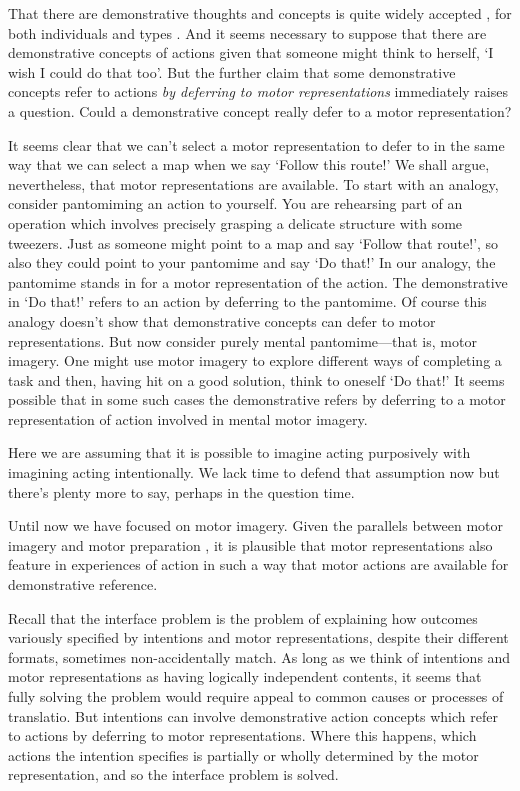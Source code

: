 \documentclass[12pt,\papersize]{extarticle}
\begin{document}
That 
there are demonstrative  thoughts and concepts is quite widely accepted
\citep[e.g.][]{McDowell:1996yi,Brewer:1999ud},
 for both individuals and types  \citep[§3.4]{levine:2010_demonstrative}.
And it seems necessary to suppose that there are demonstrative concepts of actions
given that someone might think to herself, `I wish I could do that too'.
But the further claim that some demonstrative concepts refer to actions \emph{by deferring to motor representations} immediately raises a question. 
Could a demonstrative concept really defer to a motor representation? 

It seems clear that we can't select a motor representation to defer to in the same way that we can select a map when we say `Follow this route!' 
We shall argue, nevertheless, that motor representations are available. 
To start with an analogy, consider pantomiming an action to yourself. You are rehearsing part of an operation which involves precisely grasping a delicate structure with some tweezers. Just as someone might point to a map and say `Follow that route!', so also they could point to your pantomime and say `Do that!'
 In our analogy, the pantomime stands in for a motor representation of the action.  The demonstrative in `Do that!' refers to an action by deferring to the pantomime. Of course this analogy doesn't show that demonstrative concepts can defer to motor representations. But now consider purely mental pantomime---that is, motor imagery. One might use motor imagery to explore different ways of completing a task and then, having hit on a good solution, think to oneself `Do that!' It seems possible that in some such cases the demonstrative refers by deferring to a motor representation of action involved in mental motor imagery.

Here we are assuming that 
it is possible to imagine acting purposively with imagining acting intentionally.
We lack time to defend that assumption now but 
there's plenty more to say, perhaps in the question time.

Until now we have focused on motor imagery. 
Given the parallels between motor imagery and motor preparation \citep{Jeannerod:2001yb}, it is plausible that motor representations also feature in experiences of action in such a way that motor actions are available for demonstrative reference. 

Recall that the interface problem is the problem of explaining how outcomes variously specified by intentions and motor representations, despite their different formats, sometimes non-accidentally match. As long as we think of intentions and motor representations as having logically independent contents, it seems that fully solving the problem would require appeal to 
common causes or 
processes of translatio. But intentions can involve demonstrative action concepts 
which refer to  actions by deferring to motor representations. 
Where this happens, which actions the intention specifies is partially or wholly determined by the motor representation, and so the interface problem is solved.
\end{document}
